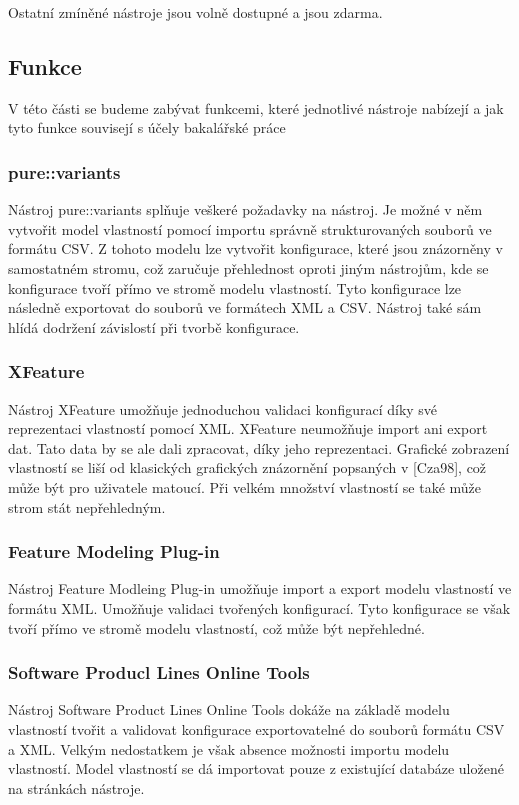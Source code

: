 Ostatní zmíněné nástroje jsou volně dostupné a jsou zdarma.

\subsection{Funkce}
V této části se budeme zabývat funkcemi, které jednotlivé nástroje nabízejí a jak tyto funkce souvisejí s účely bakalářské práce

\subsubsection{pure::variants}
Nástroj pure::variants splňuje veškeré požadavky na nástroj. Je možné v něm vytvořit model vlastností pomocí importu správně strukturovaných souborů ve formátu CSV. Z tohoto modelu lze vytvořit konfigurace, které jsou znázorněny v samostatném stromu, což zaručuje přehlednost oproti jiným nástrojům, kde se konfigurace tvoří přímo ve stromě modelu vlastností. Tyto konfigurace lze následně exportovat do souborů ve formátech XML a CSV. Nástroj také sám hlídá dodržení závislostí při tvorbě konfigurace.

\subsubsection{XFeature}
Nástroj XFeature umožňuje jednoduchou validaci konfigurací díky své reprezentaci vlastností pomocí XML. XFeature neumožňuje import ani export dat. Tato data by se ale dali zpracovat, díky jeho reprezentaci. Grafické zobrazení vlastností se liší od klasických grafických znázornění popsaných v [Cza98], což může být pro uživatele matoucí. Při velkém množství vlastností se také může strom stát nepřehledným.

\subsubsection{Feature Modeling Plug-in}
Nástroj Feature Modleing Plug-in umožňuje import a export modelu vlastností ve formátu XML. Umožňuje validaci tvořených konfigurací. Tyto konfigurace se však tvoří přímo ve stromě modelu vlastností, což může být nepřehledné. 

\subsubsection{Software Producl Lines Online Tools}
Nástroj Software Product Lines Online Tools dokáže na základě modelu vlastností tvořit a validovat konfigurace exportovatelné do souborů formátu CSV a XML. Velkým nedostatkem je však absence možnosti importu modelu vlastností. Model vlastností se dá importovat pouze z existující databáze uložené na stránkách nástroje.

